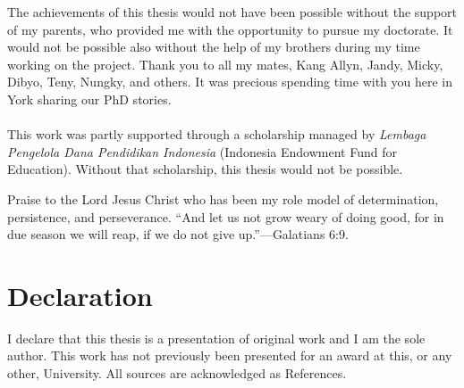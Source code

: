 \documentclass[11pt, a4paper]{report} \usepackage[titletoc]{appendix}
\begin{document}
  The achievements of this thesis would not have been possible without the support of my parents, who provided me with the opportunity to pursue my doctorate. It would not be possible also without the help of my brothers during my time working on the project. Thank you to all my mates, Kang Allyn, Jandy, Micky, Dibyo, Teny, Nungky, and others. It was precious spending time with you here in York sharing our PhD stories.
  \\
  \\
  This work was partly supported through a scholarship managed by \emph{Lembaga Pengelola Dana Pendidikan Indonesia} (Indonesia Endowment Fund for Education). Without that scholarship, this thesis would not be possible.
  
  Praise to the Lord Jesus Christ who has been my role model of determination, persistence, and perseverance. ``And let us not grow weary of doing good, for in due season we will reap, if we do not give up.''---Galatians 6:9.
  
  
  \cleardoublepage
  \chapter*{Declaration}
  I declare that this thesis is a presentation of original work and
  I am the sole author. This work has not previously been presented
  for an award at this, or any other, University. All sources are
  acknowledged as References.
  
  \cleardoublepage
  
  
  
  
  
  
  
  
  
  
  \cleardoublepage
%  
  
  
  
  \begin{appendices}
    
    
  \end{appendices}
  
\end{document}
